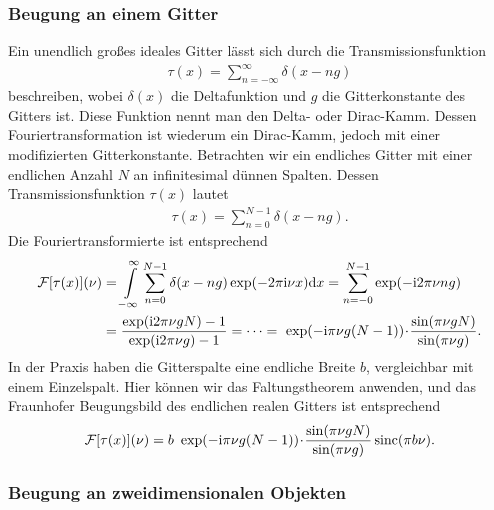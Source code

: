 \subsubsection*{Beugung an einem Gitter}

Ein unendlich großes ideales Gitter lässt sich durch die Transmissionsfunktion
\begin{align}
\tau(x)=\sum\limits_{n=-\infty}^\infty \delta(x-ng)
\end{align}
beschreiben, wobei $\delta(x)$ die Deltafunktion und $g$ die Gitterkonstante des Gitters ist. Diese Funktion nennt man den Delta- oder Dirac-Kamm. Dessen Fouriertransformation ist wiederum ein Dirac-Kamm, jedoch mit einer modifizierten Gitterkonstante.
Betrachten wir ein endliches Gitter mit einer endlichen Anzahl $N$ an infinitesimal dünnen Spalten. Dessen Transmissionsfunktion $\tau(x)$ lautet
\begin{align}
\tau(x)=\sum\limits_{n=0}^{N-1} \delta(x-ng).
\end{align}
Die Fouriertransformierte ist entsprechend
\begin{align}
\mathcal{F}[\tau(x)](\nu)&=\int\limits_{-\infty}^{\infty}\sum\limits_{n=0}^{N-1} \delta(x-ng)\exp(-2\pi\mathrm{i}\nu x)\mathrm{d} x=\sum\limits_{n=-0}^{N-1}\exp(-\mathrm{i}2\pi\nu ng)\nonumber\\
&=\frac{\exp(\mathrm{i}2\pi\nu gN)-1}{\exp(\mathrm{i}2\pi\nu g)-1}
=\dots
=~\exp(-\mathrm{i}\pi\nu g(N-1))\!\cdot\! \frac{\sin(\pi\nu gN)}{\sin(\pi\nu g)}.
\end{align}
In der Praxis haben die Gitterspalte eine endliche Breite $b$, vergleichbar mit einem Einzelspalt. Hier können wir das Faltungstheorem anwenden, und das Fraunhofer Beugungsbild des endlichen realen Gitters ist entsprechend
\begin{align}
\mathcal{F}[\tau(x)](\nu)=b~\exp(-\mathrm{i}\pi\nu g(N-1))\!\cdot\! \frac{\sin(\pi\nu gN)}{\sin(\pi\nu g)} \operatorname{sinc}(\pi b\nu).
\end{align}

\subsubsection*{Beugung an zweidimensionalen Objekten}

